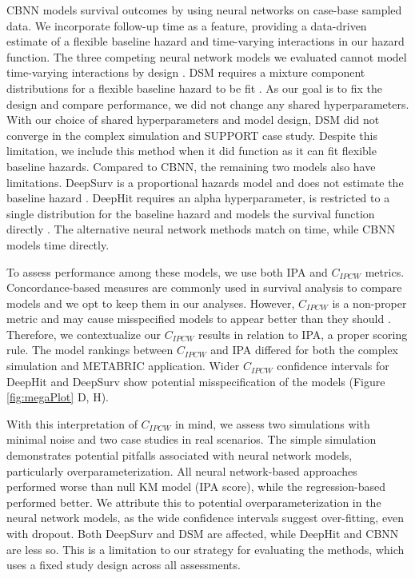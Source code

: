 \documentclass[AMA,STIX1COL,]{WileyNJD-v2}
\begin{document}
CBNN models survival outcomes by using neural networks on case-base
sampled data. We incorporate follow-up time as a feature, providing a
data-driven estimate of a flexible baseline hazard and time-varying
interactions in our hazard function. The three competing neural network
models we evaluated cannot model time-varying interactions by design
\citep{dsmPaper} \citep{katzman2018DeepSurv} \citep{lee2018DeepHit}. DSM
requires a mixture component distributions for a flexible baseline
hazard to be fit \citep{dsmPaper}. As our goal is to fix the design and
compare performance, we did not change any shared hyperparameters. With
our choice of shared hyperparameters and model design, DSM did not
converge in the complex simulation and SUPPORT case study. Despite this
limitation, we include this method when it did function as it can fit
flexible baseline hazards. Compared to CBNN, the remaining two models
also have limitations. DeepSurv is a proportional hazards model and does
not estimate the baseline hazard \citep{katzman2018DeepSurv}. DeepHit
requires an alpha hyperparameter, is restricted to a single distribution
for the baseline hazard and models the survival function directly
\citep{lee2018DeepHit}. The alternative neural network methods match on
time, while CBNN models time directly.

To assess performance among these models, we use both IPA and
\(C_{IPCW}\) metrics. Concordance-based measures are commonly used in
survival analysis to compare models and we opt to keep them in our
analyses. However, \(C_{IPCW}\) is a non-proper metric and may cause
misspecified models to appear better than they should
\citep{cindexfails2019}. Therefore, we contextualize our \(C_{IPCW}\)
results in relation to IPA, a proper scoring rule. The model rankings
between \(C_{IPCW}\) and IPA differed for both the complex simulation
and METABRIC application. Wider \(C_{IPCW}\) confidence intervals for
DeepHit and DeepSurv show potential misspecification of the models
(Figure \ref{fig:megaPlot} D, H).

With this interpretation of \(C_{IPCW}\) in mind, we assess two
simulations with minimal noise and two case studies in real scenarios.
The simple simulation demonstrates potential pitfalls associated with
neural network models, particularly overparameterization. All neural
network-based approaches performed worse than null KM model (IPA score),
while the regression-based performed better. We attribute this to
potential overparameterization in the neural network models, as the wide
confidence intervals suggest over-fitting, even with dropout. Both
DeepSurv and DSM are affected, while DeepHit and CBNN are less so. This
is a limitation to our strategy for evaluating the methods, which uses a
fixed study design across all assessments.
\end{document}
